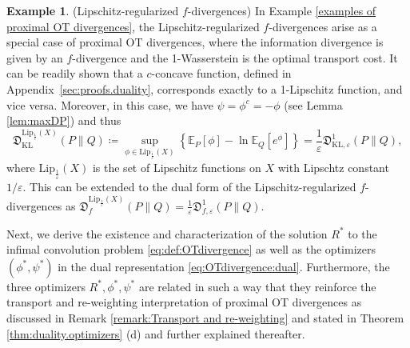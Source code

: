 \documentclass{amsart}
\newcommand{\BZ}[1]{\textcolor{olive}{BZ: #1}}
\theoremstyle{definition}
\newtheorem{example}[theorem]{Example}
\theoremstyle{remark}
\numberwithin{equation}{section}
\begin{document}
\begin{example}{(Lipschitz-regularized $f$-divergences)}
In Example \ref{examples of proximal OT divergences}, the Lipschitz-regularized $f$-divergences \cite{Gu_GPA} arise as a special case of proximal OT divergences, where the information divergence is given by an $f$-divergence and the 1-Wasserstein is the optimal transport cost. It can be readily shown that a  $c$-concave function, defined in Appendix~\ref{sec:proofs.duality}, corresponds exactly to a 1-Lipschitz function, and vice versa.  Moreover, in this case, we have $\psi=\phi^c=-\phi$ (see Lemma \ref{lem:maxDP}) and thus
\begin{equation*}
\mathfrak{D}_{\mathrm{KL}}^{{\mathrm{Lip}}_{\frac{1}{\varepsilon}}(X)}(P\|Q)\coloneqq\sup_{\phi\in {\mathrm{Lip}}_{\frac{1}{\varepsilon}}(X)}
\left\{ \mathbb{E}_P[\phi]  - \ln \mathbb{E}_Q[e^{\phi}]\right\}=\frac{1}{\varepsilon}\mathfrak{D}_{\mathrm{KL},\varepsilon}^{1}(P\|Q),
\end{equation*}
where ${\mathrm{Lip}}_{\frac{1}{\varepsilon}}(X)$ is the set of Lipschitz functions on $X$ with Lipschtz constant $1/\varepsilon$. This can be extended to the dual form of the Lipschitz-regularized $f$-divergences as  $
\mathfrak{D}_{f}^{{\mathrm{Lip}}_{\frac{1}{\varepsilon}}(X)}(P\|Q)=\frac{1}{\varepsilon}\mathfrak{D}_{f,\varepsilon}^{1}(P\|Q)$.
\end{example}
Next, we derive the existence and characterization of the solution $R^*$ to the infimal convolution problem \eqref{eq:def:OTdivergence} as well as the optimizers $(\phi^*,\psi^*)$ in the dual representation \eqref{eq:OTdivergence:dual}. Furthermore, the three optimizers $R^*,\phi^*,\psi^*$ are related in such a way that they reinforce the transport and re-weighting interpretation of proximal OT divergences as discussed in Remark \ref{remark:Transport and re-weighting} and stated in Theorem \ref{thm:duality.optimizers} (d) and further explained thereafter. 
\end{document}

